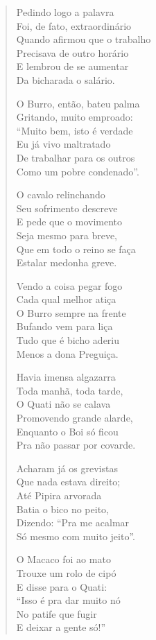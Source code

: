 \begin{verse}
Pedindo logo a palavra\\
Foi, de fato, extraordinário\\
Quando afirmou que o trabalho \\
Precisava de outro horário\\
E lembrou de se aumentar \\
Da bicharada o salário.

O Burro, então, bateu palma\\
Gritando, muito emproado:\\
“Muito bem, isto é verdade\\
Eu já vivo maltratado\\
De trabalhar para os outros\\
Como um pobre condenado”.


O cavalo relinchando\\
Seu sofrimento descreve\\
E pede que o movimento\\
Seja mesmo para breve,\\
Que em todo o reino se faça\\
Estalar medonha greve.

Vendo a coisa pegar fogo\\
Cada qual melhor atiça\\
O Burro sempre na frente\\
Bufando vem para liça\\
Tudo que é bicho aderiu\\
Menos a dona Preguiça.

Havia imensa algazarra\\
Toda manhã, toda tarde,\\
O Quati não se calava\\
Promovendo grande alarde,\\
Enquanto o Boi só ficou\\
Pra não passar por covarde.

Acharam já os grevistas\\
Que nada estava direito;\\
Até Pipira arvorada\\
Batia o bico no peito,\\
Dizendo: “Pra me acalmar\\
Só mesmo com muito jeito”.


O Macaco foi ao mato\\
Trouxe um rolo de cipó\\
E disse para o Quati:\\
“Isso é pra dar muito nó\\
No patife que fugir\\
E deixar a gente só!”


\end{verse}
